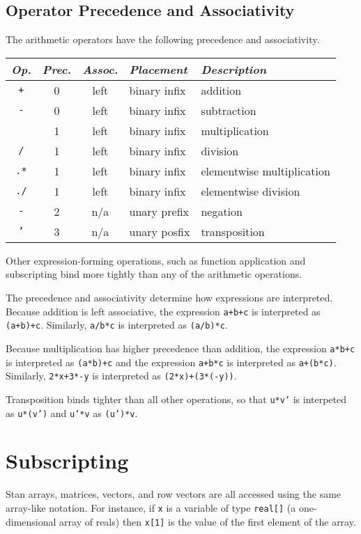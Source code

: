 \documentclass[10pt]{report}
\newcommand{\Stan}{Stan\xspace}
\newcommand{\code}[1]{{\tt #1}}
\begin{document}
\subsection{Operator Precedence and Associativity}

The arithmetic operators have the following precedence and
associativity.
%
\begin{center}
\begin{tabular}{c|ccl|l}
{\it Op.} & {\it Prec.} & {\it Assoc.} & {\it
  Placement} & {\it Description}
\\ \hline \hline
\code{+} & 0 & left & binary infix & addition
\\
\code{-} & 0 & left & binary infix & subtraction
\\ \hline
\code{*} & 1 & left & binary infix & multiplication
\\
\code{/} & 1 & left & binary infix & division
\\ \hline
\code{.*} & 1 & left & binary infix & elementwise multiplication
\\
\code{./} & 1 & left & binary infix & elementwise division
\\ \hline
\code{-} & 2 & n/a & unary prefix & negation
\\ \hline
\code{'} & 3 & n/a & unary posfix & transposition
\end{tabular}
\end{center}
%
Other expression-forming operations, such as function application and
subscripting bind more tightly than any of the arithmetic operations.  

The precedence and associativity determine how expressions are
interpreted.  Because addition is left associative, the expression
\code{a+b+c} is interpreted as \code{(a+b)+c}.  Similarly,
\code{a/b*c} is interpreted as \code{(a/b)*c}.  

Because multiplication has higher precedence than addition, the
expression \code{a*b+c} is interpreted as \code{(a*b)+c} and the
expression \code{a+b*c} is interpreted as \code{a+(b*c)}.  Similarly,
\code{2*x+3*-y} is interpreted as \code{(2*x)+(3*(-y))}.

Transposition binds tighter than all other operations, so that
\code{u*v'} is interpeted as \code{u*(v')} and \code{u'*v} as
\code{(u')*v}.

\section{Subscripting}

\Stan arrays, matrices, vectors, and row vectors are all accessed
using the same array-like notation.  For instance, if \code{x} is a
variable of type \code{real[]} (a one-dimensional array of reals)
then \code{x[1]} is the value of the first element of the
array.  
\end{document}
